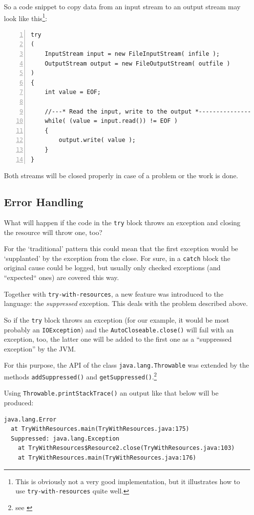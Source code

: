 \documentclass[11pt,a4paper, titlepage, parskip=half, headsepline, footsepline, cleardoublepage=current, headheight=1cm]{scrbook}
\begin{document}
So a code snippet to copy data from an input stream to an output stream may look like this\footnote{This is obviously not a very good implementation, but it illustrates how to use \lstinline|try-with-resources| quite well.}:
\begin{lstlisting}[numbers=left]
try
( 
    InputStream input = new FileInputStream( infile );
    OutputStream output = new FileOutputStream( outfile ) 
)
{
	int value = EOF;
	
    //---* Read the input, write to the output *---------------------
    while( (value = input.read()) != EOF )
    {
        output.write( value );
    }
}
\end{lstlisting}
Both streams will be closed properly in case of a problem or the work is done.

\subsection{Error Handling}
What will happen if the code in the \lstinline|try| block throws an exception and closing the resource will throw one, too?

For the ‘traditional’ pattern this could mean that the first exception would be ‘supplanted’ by the exception from the close. For sure, in a \lstinline|catch| block the original cause could be logged, but usually only checked exceptions (and “expected“ ones) are covered this way.

Together with \lstinline|try-with-resources|, a new feature was introduced to the language: the \textit{suppressed} exception. This deals with the problem described above.

So if the \lstinline|try| block throws an exception (for our example, it would be most probably an \lstinline|IOException|) and the \lstinline|AutoCloseable.close()| will fail with an exception, too, the latter one will be added to the first one as a “suppressed exception” by the JVM.

For this purpose, the API of the class \lstinline|java.lang.Throwable| was extended by the methods \lstinline|addSuppressed()| and \lstinline|getSuppressed()|.\footnote{see \autocite{ORACLE_DOC_THROWABLE_CLASS}}

Using \lstinline|Throwable.printStackTrace()| an output like that below will be produced:
\begin{lstlisting}
java.lang.Error
  at TryWithResources.main(TryWithResources.java:175)
  Suppressed: java.lang.Exception
    at TryWithResources$Resource2.close(TryWithResources.java:103)
    at TryWithResources.main(TryWithResources.java:176)
\end{lstlisting}
\end{document}
